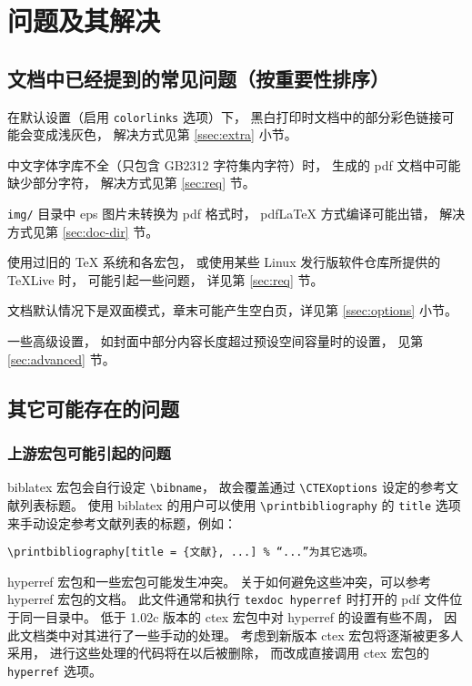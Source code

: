%

\chapter{问题及其解决}
	\section{文档中已经提到的常见问题（按重要性排序）}

	在默认设置（启用 \verb|colorlinks| 选项）下，
	黑白打印时文档中的部分彩色链接可能会变成浅灰色，
	解决方式见第 \ref{ssec:extra} 小节。

	中文字体字库不全（只包含 GB2312 字符集内字符）时，
	生成的 pdf 文档中可能缺少部分字符，
	解决方式见第 \ref{sec:req} 节。

	\verb|img/| 目录中 eps 图片未转换为 pdf 格式时，%
	pdf\LaTeX{} 方式编译可能出错，
	解决方式见第 \ref{sec:doc-dir} 节。

	使用过旧的 \TeX{} 系统和各宏包，
	或使用某些 Linux 发行版软件仓库所提供的 \TeX{}Live 时，
	可能引起一些问题，
	详见第 \ref{sec:req} 节。

	文档默认情况下是双面模式，章末可能产生空白页，详见第 \ref{ssec:options} 小节。

	一些高级设置，
	如封面中部分内容长度超过预设空间容量时的设置，
	见第 \ref{sec:advanced} 节。

	\section{其它可能存在的问题}
		\subsection{上游宏包可能引起的问题}

		biblatex 宏包\supercite{biblatex}会自行设定 \verb|\bibname|，
		故会覆盖通过 \verb|\CTEXoptions| 设定的参考文献列表标题。
		使用 biblatex 的用户可以使用 \verb|\printbibliography| 的
		\verb|title| 选项来手动设定参考文献列表的标题，例如：
\begin{Verbatim}[frame = single]
\printbibliography[title = {文献}, ...] % “...”为其它选项。
\end{Verbatim}

		hyperref 宏包\supercite{hyperref}和一些宏包可能发生冲突。
		关于如何避免这些冲突，可以参考 hyperref 宏包的文档。
		此文件通常和执行 \verb|texdoc hyperref| %
		时打开的 pdf 文件位于同一目录中。
		低于 1.02c 版本的 ctex 宏包中对 hyperref 的设置有些不周，
		因此文档类中对其进行了一些手动的处理。
		考虑到新版本 ctex 宏包将逐渐被更多人采用，
		进行这些处理的代码将在以后被删除，
		而改成直接调用 ctex 宏包的 \verb|hyperref| 选项。

